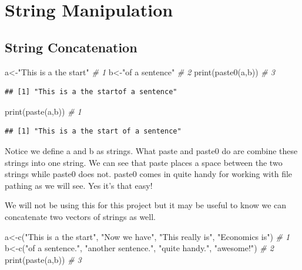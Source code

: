 \documentclass[
]{book}
\newenvironment{Shaded}{\begin{snugshade}}{\end{snugshade}}
\newcommand{\CommentTok}[1]{\textcolor[rgb]{0.56,0.35,0.01}{\textit{#1}}}
\newcommand{\FunctionTok}[1]{\textcolor[rgb]{0.00,0.00,0.00}{#1}}
\newcommand{\NormalTok}[1]{#1}
\newcommand{\OtherTok}[1]{\textcolor[rgb]{0.56,0.35,0.01}{#1}}
\newcommand{\StringTok}[1]{\textcolor[rgb]{0.31,0.60,0.02}{#1}}
\begin{document}
\hypertarget{string-manipulation}{%
\section{String Manipulation}\label{string-manipulation}}

\hypertarget{string-concatenation}{%
\subsection{String Concatenation}\label{string-concatenation}}

\begin{Shaded}
\begin{Highlighting}[]
\NormalTok{a}\OtherTok{\textless{}{-}}\StringTok{"This is a the start"}  \CommentTok{\# 1}
\NormalTok{b}\OtherTok{\textless{}{-}}\StringTok{"of a sentence"}        \CommentTok{\# 2}
\FunctionTok{print}\NormalTok{(}\FunctionTok{paste0}\NormalTok{(a,b))        }\CommentTok{\# 3}
\end{Highlighting}
\end{Shaded}

\begin{verbatim}
## [1] "This is a the startof a sentence"
\end{verbatim}

\begin{Shaded}
\begin{Highlighting}[]
\FunctionTok{print}\NormalTok{(}\FunctionTok{paste}\NormalTok{(a,b))  }\CommentTok{\# 1}
\end{Highlighting}
\end{Shaded}

\begin{verbatim}
## [1] "This is a the start of a sentence"
\end{verbatim}

Notice we define a and b as strings. What paste and paste0 do are combine these strings into one string. We can see that paste places a space between the two strings while paste0 does not. paste0 comes in quite handy for working with file pathing as we will see. Yes it's that easy!

We will not be using this for this project but it may be useful to know we can concatenate two vectors of strings as well.

\begin{Shaded}
\begin{Highlighting}[]
\NormalTok{a}\OtherTok{\textless{}{-}}\FunctionTok{c}\NormalTok{(}\StringTok{"This is a the start"}\NormalTok{, }\StringTok{"Now we have"}\NormalTok{, }\StringTok{"This really is"}\NormalTok{, }\StringTok{"Economics is"}\NormalTok{)  }\CommentTok{\# 1}
\NormalTok{b}\OtherTok{\textless{}{-}}\FunctionTok{c}\NormalTok{(}\StringTok{"of a sentence."}\NormalTok{, }\StringTok{"another sentence."}\NormalTok{, }\StringTok{"quite handy."}\NormalTok{, }\StringTok{"awesome!"}\NormalTok{)       }\CommentTok{\# 2}
\FunctionTok{print}\NormalTok{(}\FunctionTok{paste}\NormalTok{(a,b))                                                             }\CommentTok{\# 3}
\end{Highlighting}
\end{Shaded}
\end{document}
